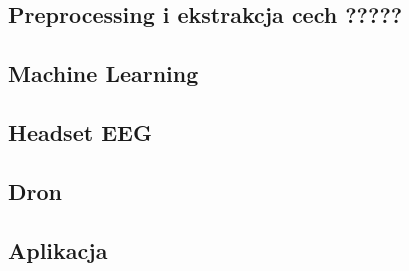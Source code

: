 \subsection{Preprocessing i ekstrakcja cech ?????}
\subsection{Machine Learning}
\subsection{Headset EEG}
\subsection{Dron}
\subsection{Aplikacja}